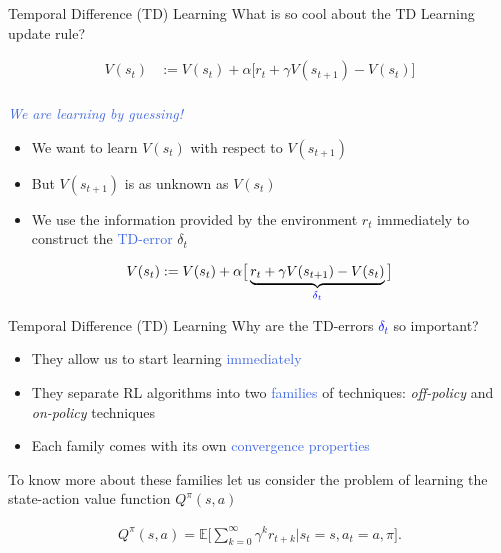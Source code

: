 \documentclass{beamer}
\begin{document}
\begin{frame}{Temporal Difference (TD) Learning}
	What is so cool about the TD Learning update rule?

	\begin{align*}
		V(s_t) & := V(s_t) + \alpha \big[r_t + \gamma V(s_{t+1}) - V(s_t)\big] \\
	\end{align*}

	\begin{center}
	\textcolor{RoyalBlue}{\textit{We are learning by guessing!}}
	\end{center}

	\bigskip

	\begin{itemize}
		\item We want to learn $V(s_t)$ with respect to $V(s_{t+1})$
		\item But $V(s_{t+1})$ is as unknown as $V(s_t)$
		\item We use the information provided by the environment $r_t$ immediately to construct the \textcolor{RoyalBlue}{TD-error} $\delta_t$
	\end{itemize}

	\begin{align*}
		V(s_t) & := V(s_t) + \alpha \big[\underbrace{r_t + \gamma V(s_{t+1})-V(s_t)}_{\textcolor{blue}{\delta_t}}\big] \\
	\end{align*}
\end{frame}

\begin{frame}{Temporal Difference (TD) Learning}
	Why are the TD-errors \textcolor{blue}{$\delta_t$} so important?
	\begin{itemize}
		\item They allow us to start learning \textcolor{RoyalBlue}{immediately} 
		\item They separate RL algorithms into two \textcolor{RoyalBlue}{families} of techniques: \textit{off-policy} and \textit{on-policy} techniques
		\item Each family comes with its own \textcolor{RoyalBlue}{convergence properties}
	\end{itemize}

	\bigskip

	To know more about these families let us consider the problem of learning the state-action value function $Q^{\pi}(s,a)$
	
	\begin{align*}
     	Q^{\pi}(s,a)=\mathds{E}\bigg[\sum_{k=0}^{\infty}\gamma^{k}r_{t+k} \bigg| s_t = s, a_t=a, \pi\bigg].
	\end{align*}
\end{frame}
\end{document}
